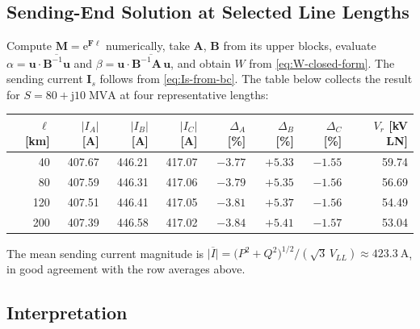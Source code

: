 \documentclass[11pt,a4paper]{article}
\newcommand{\jj}{\mathrm{j}}
\newcommand{\ee}{\mathrm{e}}
\newcommand{\matA}{\bm{A}}
\newcommand{\matB}{\bm{B}}
\newcommand{\matM}{\bm{M}}
\newcommand{\matF}{\bm{F}}
\newcommand{\vI}{\bm{I}}
\newcommand{\vu}{\bm{u}}
\begin{document}
\subsection{Sending-End Solution at Selected Line Lengths}

Compute \(\matM=\ee^{\matF\ell}\) numerically, take \(\matA\), \(\matB\) from
its upper blocks, evaluate \(\alpha=\vu\cdot\overline{\matB^{-1}\vu}\) and
\(\beta=\vu\cdot\overline{\matB^{-1}\matA\,\vu}\), and obtain \(W\) from
\eqref{eq:W-closed-form}. The sending current \(\vI_{s}\) follows from
\eqref{eq:Is-from-bc}. The table below collects the result for
\(S=80+\jj 10\;\si{\mega\volt\ampere}\) at four representative lengths:

\begin{center}
\renewcommand{\arraystretch}{1.15}
\begin{tabular}{rrrrrrrr}
\toprule
\(\ell\) [km] & \(|I_{A}|\) [A] & \(|I_{B}|\) [A] & \(|I_{C}|\) [A] &
\(\Delta_{A}\) [\%] & \(\Delta_{B}\) [\%] & \(\Delta_{C}\) [\%] &
\(V_{r}\) [kV LN]\\
\midrule
40   & 407.67 & 446.21 & 417.07 & \(-3.77\) & \(+5.33\) & \(-1.55\) & 59.74 \\
80   & 407.59 & 446.31 & 417.06 & \(-3.79\) & \(+5.35\) & \(-1.56\) & 56.69 \\
120  & 407.51 & 446.41 & 417.05 & \(-3.81\) & \(+5.37\) & \(-1.56\) & 54.49 \\
200  & 407.39 & 446.58 & 417.02 & \(-3.84\) & \(+5.41\) & \(-1.57\) & 53.04 \\
\bottomrule
\end{tabular}
\end{center}
The mean sending current magnitude is
\(\overline{|I|}=\bigl(P^{2}+Q^{2}\bigr)^{1/2}\!/(\sqrt{3}\,V_{LL})\approx
\SI{423.3}{\ampere}\), in good agreement with the row averages above.

\subsection{Interpretation}
\end{document}
